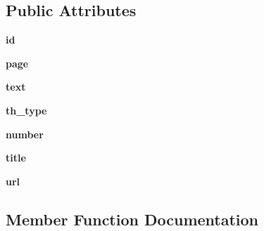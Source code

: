 \subsection*{Public Attributes}
\begin{DoxyCompactItemize}
\item 
\hypertarget{classtexla_1_1PageTree_1_1TheoremsManager_1_1Theorem_ae4801c9a2372be00c472bc293f7bd312}{}\label{classtexla_1_1PageTree_1_1TheoremsManager_1_1Theorem_ae4801c9a2372be00c472bc293f7bd312} 
{\bfseries id}
\item 
\hypertarget{classtexla_1_1PageTree_1_1TheoremsManager_1_1Theorem_a6e0dbaa9c063f72d6d62cc6bbdadb945}{}\label{classtexla_1_1PageTree_1_1TheoremsManager_1_1Theorem_a6e0dbaa9c063f72d6d62cc6bbdadb945} 
{\bfseries page}
\item 
\hypertarget{classtexla_1_1PageTree_1_1TheoremsManager_1_1Theorem_a9e3436a8dc4af492ee8431928bcca358}{}\label{classtexla_1_1PageTree_1_1TheoremsManager_1_1Theorem_a9e3436a8dc4af492ee8431928bcca358} 
{\bfseries text}
\item 
\hypertarget{classtexla_1_1PageTree_1_1TheoremsManager_1_1Theorem_aaf9edaa707fa727934206afd285cfc00}{}\label{classtexla_1_1PageTree_1_1TheoremsManager_1_1Theorem_aaf9edaa707fa727934206afd285cfc00} 
{\bfseries th\+\_\+type}
\item 
\hypertarget{classtexla_1_1PageTree_1_1TheoremsManager_1_1Theorem_ac634737d4833043e63bffea7866451fd}{}\label{classtexla_1_1PageTree_1_1TheoremsManager_1_1Theorem_ac634737d4833043e63bffea7866451fd} 
{\bfseries number}
\item 
\hypertarget{classtexla_1_1PageTree_1_1TheoremsManager_1_1Theorem_ada861276b37b38190fbed67e25145e6c}{}\label{classtexla_1_1PageTree_1_1TheoremsManager_1_1Theorem_ada861276b37b38190fbed67e25145e6c} 
{\bfseries title}
\item 
\hypertarget{classtexla_1_1PageTree_1_1TheoremsManager_1_1Theorem_a33f5654cfd0f472b558378d2ddce0c14}{}\label{classtexla_1_1PageTree_1_1TheoremsManager_1_1Theorem_a33f5654cfd0f472b558378d2ddce0c14} 
{\bfseries url}
\end{DoxyCompactItemize}


\subsection{Member Function Documentation}
\hypertarget{classtexla_1_1PageTree_1_1TheoremsManager_1_1Theorem_a95c04605568b92d092b5c30b1538e318}{}\label{classtexla_1_1PageTree_1_1TheoremsManager_1_1Theorem_a95c04605568b92d092b5c30b1538e318} 
